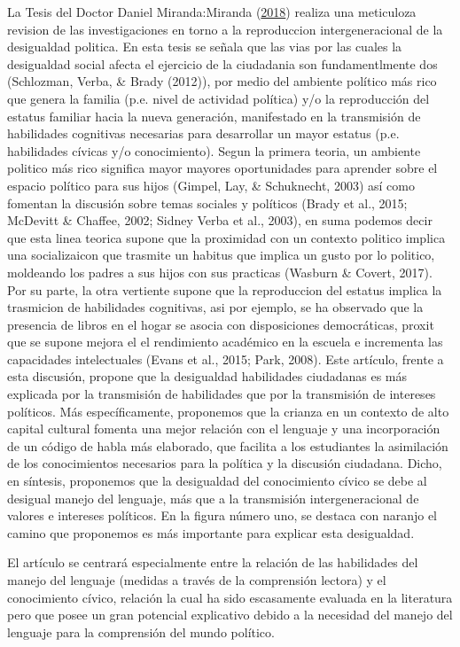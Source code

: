 \documentclass[
]{article}
\begin{document}
La Tesis del Doctor Daniel Miranda:Miranda
(\protect\hyperlink{ref-mirandaDesigualdadCiudadaniaAproximacion2018}{2018})
realiza una meticuloza revision de las investigaciones en torno a la
reproduccion intergeneracional de la desigualdad politica. En esta tesis
se señala que las vias por las cuales la desigualdad social afecta el
ejercicio de la ciudadania son fundamentlmente dos (Schlozman, Verba, \&
Brady (2012)), por medio del ambiente político más rico que genera la
familia (p.e. nivel de actividad política) y/o la reproducción del
estatus familiar hacia la nueva generación, manifestado en la
transmisión de habilidades cognitivas necesarias para desarrollar un
mayor estatus (p.e. habilidades cívicas y/o conocimiento). Segun la
primera teoria, un ambiente politico más rico significa mayor mayores
oportunidades para aprender sobre el espacio político para sus hijos
(Gimpel, Lay, \& Schuknecht, 2003) así como fomentan la discusión sobre
temas sociales y políticos (Brady et al., 2015; McDevitt \& Chaffee,
2002; Sidney Verba et al., 2003), en suma podemos decir que esta linea
teorica supone que la proximidad con un contexto politico implica una
socializaicon que trasmite un habitus que implica un gusto por lo
politico, moldeando los padres a sus hijos con sus practicas (Wasburn \&
Covert, 2017). Por su parte, la otra vertiente supone que la
reproduccion del estatus implica la trasmicion de habilidades
cognitivas, asi por ejemplo, se ha observado que la presencia de libros
en el hogar se asocia con disposiciones democráticas, proxit que se
supone mejora el el rendimiento académico en la escuela e incrementa las
capacidades intelectuales (Evans et al., 2015; Park, 2008). Este
artículo, frente a esta discusión, propone que la desigualdad
habilidades ciudadanas es más explicada por la transmisión de
habilidades que por la transmisión de intereses políticos. Más
específicamente, proponemos que la crianza en un contexto de alto
capital cultural fomenta una mejor relación con el lenguaje y una
incorporación de un código de habla más elaborado, que facilita a los
estudiantes la asimilación de los conocimientos necesarios para la
política y la discusión ciudadana. Dicho, en síntesis, proponemos que la
desigualdad del conocimiento cívico se debe al desigual manejo del
lenguaje, más que a la transmisión intergeneracional de valores e
intereses políticos. En la figura número uno, se destaca con naranjo el
camino que proponemos es más importante para explicar esta desigualdad.

El artículo se centrará especialmente entre la relación de las
habilidades del manejo del lenguaje (medidas a través de la comprensión
lectora) y el conocimiento cívico, relación la cual ha sido escasamente
evaluada en la literatura pero que posee un gran potencial explicativo
debido a la necesidad del manejo del lenguaje para la comprensión del
mundo político.
\end{document}
